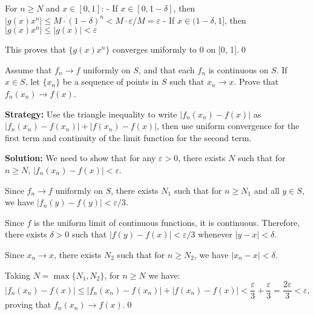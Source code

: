 For \( n \geq N \) and \( x \in [0, 1] \):
- If \( x \in [0, 1 - \delta] \), then \( |g(x)x^n| \leq M \cdot (1 - \delta)^n < M \cdot \varepsilon/M = \varepsilon \)
- If \( x \in (1 - \delta, 1] \), then \( |g(x)x^n| \leq |g(x)| < \varepsilon \)

This proves that \( \{g(x)x^n\} \) converges uniformly to 0 on [0, 1].\qed


\begin{problembox}
\begin{problemstatement}
Assume that \( f_n \to f \) uniformly on \( S \), and that each \( f_n \) is continuous on \( S \). If \( x \in S \), let \( \{x_n\} \) be a sequence of points in \( S \) such that \( x_n \to x \). Prove that \( f_n(x_n) \to f(x) \).
\end{problemstatement}
\end{problembox}

\noindent\textbf{Strategy:} Use the triangle inequality to write \( |f_n(x_n) - f(x)| \) as \( |f_n(x_n) - f(x_n)| + |f(x_n) - f(x)| \), then use uniform convergence for the first term and continuity of the limit function for the second term.

\bigskip\noindent\textbf{Solution:} We need to show that for any \( \varepsilon > 0 \), there exists \( N \) such that for \( n \geq N \), \( |f_n(x_n) - f(x)| < \varepsilon \).

Since \( f_n \to f \) uniformly on \( S \), there exists \( N_1 \) such that for \( n \geq N_1 \) and all \( y \in S \), we have \( |f_n(y) - f(y)| < \varepsilon/3 \).

Since \( f \) is the uniform limit of continuous functions, it is continuous. Therefore, there exists \( \delta > 0 \) such that \( |f(y) - f(x)| < \varepsilon/3 \) whenever \( |y - x| < \delta \).

Since \( x_n \to x \), there exists \( N_2 \) such that for \( n \geq N_2 \), we have \( |x_n - x| < \delta \).

Taking \( N = \max\{N_1, N_2\} \), for \( n \geq N \) we have:
\[|f_n(x_n) - f(x)| \leq |f_n(x_n) - f(x_n)| + |f(x_n) - f(x)| < \frac{\varepsilon}{3} + \frac{\varepsilon}{3} = \frac{2\varepsilon}{3} < \varepsilon,\]
proving that \( f_n(x_n) \to f(x) \).\qed


